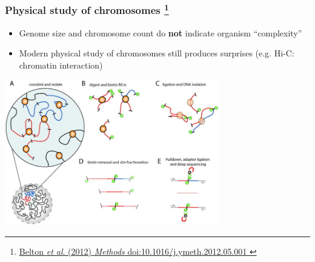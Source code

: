 %
\begin{frame}
  \frametitle{Physical study of chromosomes
  \footnote{\tiny{\href{http://dx.doi.org/10.1038/nature03895
}{Belton \textit{et al}. (2012) \textit{Methods} doi:10.1016/j.ymeth.2012.05.001
}}}
  }
  \begin{itemize}
    \item \textcolor{hutton_green}{Genome size and chromosome count do \textbf{not} indicate organism ``complexity''}
    \item \textcolor{hutton_blue}{Modern physical study of chromosomes still produces surprises (e.g. Hi-C: chromatin interaction)}
  \end{itemize}
  \begin{center}
    \includegraphics[width=0.7\textwidth]{images/nihms418977f1}
  \end{center}  
\end{frame}


